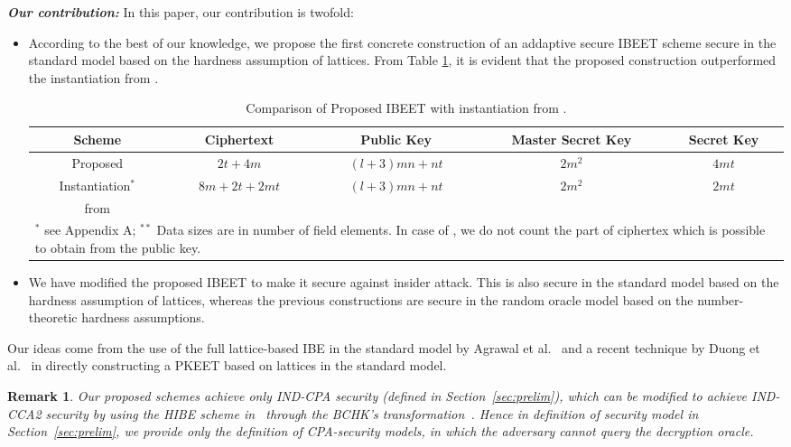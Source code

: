 \documentclass[runningheads]{llncs}
\newtheorem{rem}[thm]{Remark}
\begin{document}
	\noindent\textbf{\em Our contribution:}
	In this paper, our contribution is twofold:
	\begin{itemize}
	\item According to the best of our knowledge, we propose the first concrete construction of an addaptive secure IBEET scheme secure in the standard model based on the hardness assumption of lattices. From Table \ref{tab1}, it is evident that the proposed construction outperformed the instantiation from \cite{Lee2016}.
	{\renewcommand{\arraystretch}{1.2}
	\setlength{\tabcolsep}{5pt}
	\begin{table}[ht]
		\footnotesize
		\begin{center}
			\caption{Comparison of Proposed IBEET with instantiation from \cite{Lee2016}.}
			\begin{tabular}{c c c c c}
				\toprule
				Scheme & Ciphertext & Public Key & Master Secret Key & Secret Key \\ 
				\midrule
			
				Proposed & $2t + 4m$ &  $(l+3)mn+nt$ & $2m^2$ & $4mt$\\
				Instantiation$^*$ &  $8m+2t +2mt$ &  $(l+3)mn+nt$ & $2m^2$ & $2mt$\\
				from \cite{Lee2016} &  &   &  &\\
				\toprule
				
				\multicolumn{5}{l}{ \parbox[t]{1.0\textwidth}{$^*$ see Appendix A; $^{**}$ Data sizes are in number of field elements. In case of \cite{Lee2016}, we do not count the part of  ciphertex which is possible to obtain from the public key. }} \\
			\end{tabular}
			\label{tab1}
		\end{center}
		
	\end{table}
}
\normalsize
	\item We have modified the proposed IBEET to make it secure against insider attack. This is also secure in the standard model based on the hardness assumption of lattices, whereas the previous constructions are secure in the random oracle model based on the number-theoretic hardness assumptions.
	\end{itemize}
Our ideas come from the use of the full lattice-based IBE  in the standard model by Agrawal et al.~\cite{ABB10-EuroCrypt} and a recent technique by Duong et al.~\cite{Duong19} in directly constructing a PKEET based on lattices in the standard model. 
\begin{rem}
	Our proposed schemes achieve only IND-CPA security (defined in Section~\ref{sec:prelim}), which can be modified to achieve IND-CCA2 security by using the HIBE scheme in~\cite{ABB10-EuroCrypt} through the BCHK's transformation~\cite{BCHK07}. Hence in definition of security model in Section~\ref{sec:prelim}, we provide only the definition of CPA-security models, in which the adversary cannot query the decryption oracle.
\end{rem}
\end{document}
